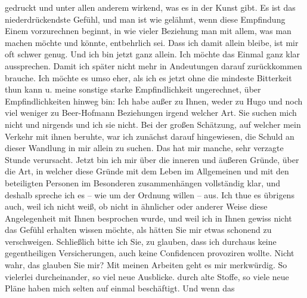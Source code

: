 \begin{ledgroupsized}[t]{13cm}
               gedruckt und unter allen anderem wirkend, was es in der Kunst gibt. Es ist das
               niederdrückendste Gefühl, und man ist wie gelähmt, wenn diese Empfindung Einem
               vorzurechnen beginnt, in wie vieler Beziehung man mit allem, was man machen möchte
               und könnte, entbehrlich sei. Dass ich damit allein bleibe, ist mir oft schwer genug.
               Und ich bin jetzt ganz allein. Ich möchte das Einmal ganz klar aussprechen. Damit ich
               später nicht mehr in Andeutungen darauf zurückkommen brauche. Ich möchte es umso
               eher, als ich es jetzt ohne die mindeste Bitterkeit thun kann u. meine sonstige
               starke Empfindlichkeit ungerechnet, über Empfindlichkeiten hinweg bin: Ich habe außer
               zu Ihnen, weder zu Hugo und noch viel weniger
               zu Beer-Hofmann Beziehungen irgend welcher
               Art. Sie suchen mich nicht und nirgends und ich sie nicht. {\pb}Bei der großen Schätzung, auf
               welcher mein Verkehr mit ihnen beruhte, war ich zunächst darauf hingewiesen, die
               Schuld an dieser Wandlung in mir allein zu suchen. Das hat mir manche, sehr verzagte
               Stunde verursacht. Jetzt bin ich mir über die inneren und äußeren Gründe, über die
               Art, in welcher diese Gründe mit dem Leben im Allgemeinen und mit den \introOben{}beteiligten\introOben{} Personen im Besonderen zusammenhängen vollständig
               klar, und deshalb spreche ich es – wie um der Ordnung willen – aus. Ich thue \introOben{}es\introOben{} übrigens auch, weil ich nicht weiß, ob nicht in ähnlicher
               oder anderer Weise diese Angelegenheit mit Ihnen besprochen wurde, und weil ich in
               Ihnen gewiss nicht das Gefühl erhalten wissen möchte, als hätten Sie mir etwas
               schonend zu verschweigen. Schließlich bitte ich Sie, zu glauben, dass ich durchaus
               keine gegentheiligen Versicherungen, auch keine Confidencen provoziren wollte. Nicht
               wahr, das glauben Sie mir? \pend
           \pstart
           {\pb}Mit meinen Arbeiten geht es
               mir merkwürdig. So vielerlei durcheinander, so viel neue Ausblicke. durch alte
               Stoffe, so viele neue Pläne haben mich selten auf einmal beschäftigt. Und wenn das

\end{ledgroupsized}
